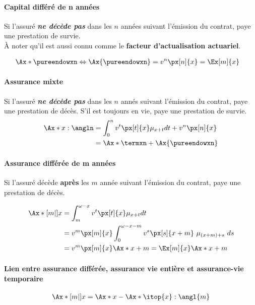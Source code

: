 \documentclass[10pt, french]{article}
\begin{document}
\begin{multicols*}{3}
\paragraph{Capital différé de n années} Si l'assuré \textbf{\textit{ne décède pas}} dans les $n$ années suivant l'émission du contrat, paye une prestation de survie.\\
À noter qu'il est aussi connu comme le \textbf{facteur d'actualisation actuariel}.

\begin{align*}
	\Ax*{\pureendowxn}	
		&\Leftrightarrow \Ax{\pureendowxn}
		= v^{n} \px[n]{x} 
		= \Ex[m]{x}
\end{align*}

\paragraph{Assurance mixte} Si l'assuré \textbf{\textit{ne décède pas}} dans les $n$ annés suivant l'émission du contrat, paye une prestation de décès. S'il est toujours en vie, paye une prestation de survie.
\begin{align*}
\Ax*{x:\angln}	
	&= \int_{0}^{n} v^t \px[t]{x} \mu_{x+t} dt + v^n \px[n]{x} \\
	&= \Ax*{\termxn} + \Ax{\pureendowxn} 
\end{align*}

\paragraph{Assurance différée de m années} Si l'assuré décède \textbf{après} les $m$ année suivant l'émission du contrat, paye une prestation de décès.

\begin{align*}
\Ax*[m|]{x}	
	&= \int_{m}^{\omega -x} v^t \px[t]{x} \mu_{x+t} dt \\
	&= v^m \px[m]{x} \int_{0}^{\omega - x - m} v^s \px[s]{x+m} \ \mu_{(x+m)+s} \ ds \\
	&= v^m \px[m]{x} \Ax*{x+m} = \Ex[m]{x} \Ax*{x+m} 
\end{align*}

\paragraph{Lien entre assurance différée, assurance vie entière et assurance-vie temporaire}
\begin{align*}
\Ax*[m|]{x}		&= \Ax*{x} - \Ax*{\itop{x}:\angl{m}} \\
\end{align*}


\end{multicols*}
\end{document}
